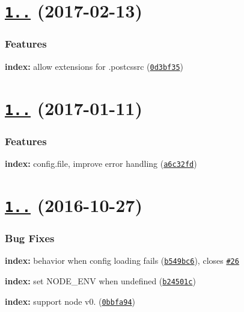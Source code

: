 \label{_1.2.0}%
 \section*{\href{https://github.com/michael-ciniawsky/postcss-load-config/compare/v1.1.0...v1.2.0}{\tt 1..} (2017-\/02-\/13)}

\subsubsection*{Features}


\begin{DoxyItemize}
\item {\bfseries index\+:} allow extensions for .postcssrc (\href{https://github.com/michael-ciniawsky/postcss-load-config/commit/0d3bf35}{\tt 0d3bf35})
\end{DoxyItemize}

\label{_1.1.0}%
 \section*{\href{https://github.com/michael-ciniawsky/postcss-load-config/compare/v1.0.0...v1.1.0}{\tt 1..} (2017-\/01-\/11)}

\subsubsection*{Features}


\begin{DoxyItemize}
\item {\bfseries index\+:} config.\+file, improve error handling (\href{https://github.com/michael-ciniawsky/postcss-load-config/commit/a6c32fd}{\tt a6c32fd})
\end{DoxyItemize}

\label{_1.0.0}%
 \section*{\href{(https://github.com/michael-ciniawsky/postcss-load-config/compare/v1.0.0-rc...1.0.0)}{\tt 1..} (2016-\/10-\/27)}

\subsubsection*{Bug Fixes}


\begin{DoxyItemize}
\item {\bfseries index\+:} behavior when config loading fails (\href{https://github.com/michael-ciniawsky/postcss-load-config/commit/b549bc6}{\tt b549bc6}), closes \href{https://github.com/michael-ciniawsky/postcss-load-config/issues/26}{\tt \#26}
\item {\bfseries index\+:} set N\+O\+D\+E\+\_\+\+E\+NV when undefined (\href{https://github.com/michael-ciniawsky/postcss-load-config/commit/b24501c}{\tt b24501c})
\item {\bfseries index\+:} support node v0. (\href{https://github.com/michael-ciniawsky/postcss-load-config/commit/0bbfa94}{\tt 0bbfa94})
\end{DoxyItemize}

